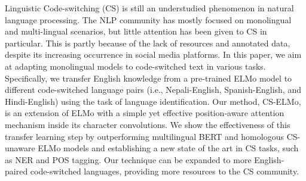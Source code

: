 Linguistic Code-switching (CS) is still an understudied phenomenon in natural language processing. The NLP community has mostly focused on monolingual and multi-lingual scenarios, but little attention has been given to CS in particular. This is partly because of the lack of resources and annotated data, despite its increasing occurrence in social media platforms. In this paper, we aim at adapting monolingual models to code-switched text in various tasks. Specifically, we transfer English knowledge from a pre-trained ELMo model to different code-switched language pairs (i.e., Nepali-English, Spanish-English, and Hindi-English) using the task of language identification. Our method, CS-ELMo, is an extension of ELMo with a simple yet effective position-aware attention mechanism inside its character convolutions. We show the effectiveness of this transfer learning step by outperforming multilingual BERT and homologous CS-unaware ELMo models and establishing a new state of the art in CS tasks, such as NER and POS tagging. Our technique can be expanded to more English-paired code-switched languages, providing more resources to the CS community.
